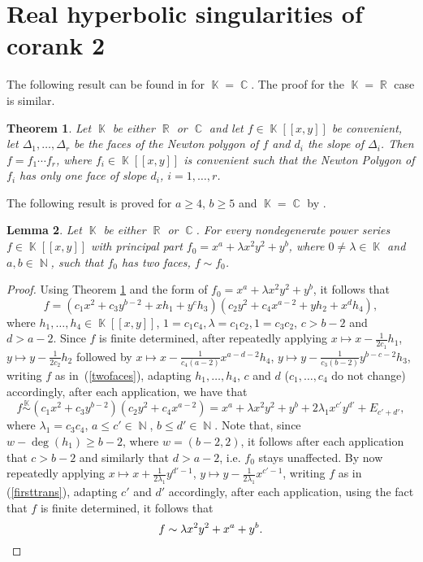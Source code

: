 \documentclass[noend]{amsproc}
\newtheorem{theorem}{Theorem}
\newtheorem{lemma}[theorem]{Lemma}
\theoremstyle{definition}
\DeclareMathOperator{\N}{\mathbb{N}}
\DeclareMathOperator{\R}{\mathbb{R}}
\DeclareMathOperator{\C}{\mathbb{C}}
\DeclareMathOperator{\K}{\mathbb{K}}
\begin{document}
\clearpage


\section{Real hyperbolic singularities of corank 2}
The following result can be found in \citet{PdJ2000} for $\K=\C$. The proof for
the $\K=\R$ case is similar.

\begin{theorem}\label{faces}
Let $\K$ be either $\R$ or $\C$ and let $f\in\K[[x,y]]$ be convenient, let
$\Delta_1,\ldots,\Delta_r$ be the faces of the Newton polygon of $f$ and $d_i$
the slope of $\Delta_i$. Then $f=f_1\cdots f_r$, where $f_i\in\K[[x,y]]$ is
convenient such that the Newton Polygon of $f_i$ has only one face of slope
$d_i$, $i=1,\ldots,r$.
\end{theorem}

The following result is proved for $a\ge 4$, $b\ge 5$ and $\K=\C$ by
\citet{A1974}.

\begin{lemma}\label{principalpart}
Let $\K$ be either $\R$ or $\C$. For every nondegenerate power series
$f\in\K[[x,y]]$ with principal part $f_0=x^a+\lambda x^2y^2+y^b$, where
$0\neq\lambda\in\K$ and $a,b\in\N$, such that $f_0$ has two faces,
$f\sim f_0$.
\end{lemma}
\begin{proof}
Using Theorem \ref{faces} and the form of $f_0=x^a+\lambda x^2y^2+y^b$, it
follows that
\begin{equation}\label{twofaces}
f=(c_1x^2+c_3y^{b-2}+xh_1+y^ch_3)(c_2y^2+c_4x^{a-2}+yh_2+x^dh_4),
\end{equation}
where $h_1,\ldots,h_4\in\K[[x,y]]$, $1=c_1c_4, \lambda=c_1c_2, 1=c_3c_2$,
$c>b-2$ and $d>a-2$. Since $f$ is finite determined, after repeatedly applying
$x\mapsto x-\frac{1}{2c_1}h_1$, $y\mapsto y-\frac{1}{2c_2}h_2$ followed by
$x\mapsto x-\frac{1}{c_4(a-2)}x^{a-d-2}h_4$,
$y\mapsto y-\frac{1}{c_3(b-2)}y^{b-c-2} h_3$, writing $f$ as
in~(\ref{twofaces}), adapting $h_1,\ldots,h_4$, $c$ and $d$ ($c_1,\ldots,c_4$
do not change) accordingly, after each application, we have that
\begin{equation}
f\overset{\K}\sim (c_1x^2+c_3y^{b-2})(c_2y^2+c_4x^{a-2})
=x^a+\lambda x^2y^2+y^b+2\lambda_1x^{c'}y^{d'}+E_{c'+d'},\label{firsttrans}
\end{equation}
where $\lambda_1=c_3c_4$, $a\le c'\in\N$, $b\le d'\in\N$. Note that, since
$w-\deg(h_1)\ge b-2$, where $w=(b-2,2)$, it follows after each application
that $c>b-2$ and similarly that $d>a-2$, i.e. $f_0$ stays unaffected. By now
repeatedly applying $x\mapsto x+\frac{1}{2\lambda_1}y^{d'-1}$,
$y\mapsto y-\frac{1}{2\lambda_1}x^{c'-1}$, writing $f$ as in
(\ref{firsttrans}), adapting $c'$ and $d'$ accordingly, after each application,
using the fact that $f$ is finite determined, it follows that
\[f\sim \lambda x^2y^2+x^a+y^b.\qedhere\]
\end{proof}
\end{document}
